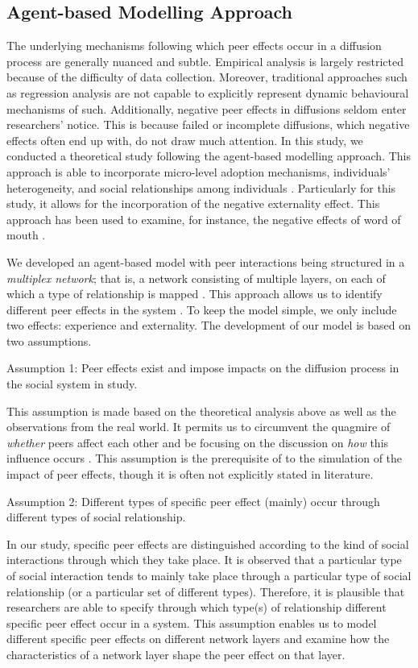 \documentclass{bmcart}
\begin{document}
\subsection*{Agent-based Modelling Approach}
The underlying mechanisms following which peer effects occur in a diffusion process are generally nuanced and subtle. Empirical analysis is largely restricted because of the difficulty of data collection. Moreover, traditional approaches such as regression analysis are not capable to explicitly represent dynamic behavioural mechanisms of such. Additionally, negative peer effects in diffusions seldom enter researchers' notice. This is because failed or incomplete diffusions, which negative effects often end up with, do not draw much attention. In this study, we conducted a theoretical study following the agent-based modelling approach. This approach is able to incorporate micro-level adoption mechanisms, individuals' heterogeneity, and social relationships among individuals \cite{Kiesling2012}. Particularly for this study, it allows for the incorporation of the negative externality effect. This approach has been used to examine, for instance, the negative effects of word of mouth \cite{Goldenberg2001,Deffuant2005}.

We developed an agent-based model with peer interactions being structured in a \emph{multiplex network}; that is, a network consisting of multiple layers, on each of which a type of relationship is mapped \cite{Arenas2014}. This approach allows us to identify different peer effects in the system \cite{Bramoulle2009,Goldsmith-Pinkham2013}. To keep the model simple, we only include two effects: experience and externality. The development of our model is based on two assumptions.

Assumption 1: Peer effects exist and impose impacts on the diffusion process in the social system in study.

This assumption is made based on the theoretical analysis above as well as the observations from the real world. It permits us to circumvent the quagmire of \emph{whether} peers affect each other and be focusing on the discussion on \emph{how} this influence occurs \cite{Guryan2008}. This assumption is the prerequisite of to the simulation of the impact of peer effects, though it is often not explicitly stated in literature.
 
Assumption 2: Different types of specific peer effect (mainly) occur through different types of social relationship.

In our study, specific peer effects are distinguished according to the kind of social interactions through which they take place. It is observed that a particular type of social interaction tends to mainly take place through a particular type of social relationship (or a particular set of different types). Therefore, it is plausible that researchers are able to specify through which type(s) of relationship different specific peer effect occur in a system. This assumption enables us to model different specific peer effects on different network layers and examine how the characteristics of a network layer shape the peer effect on that layer.
\end{document}
